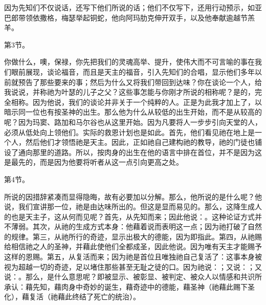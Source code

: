 因为先知们不仅说话，还写下他们所说的话；他们不仅写下，还用行动预示，如亚巴郎带领依撒格，梅瑟举起铜蛇，他向阿玛肋克伸开双手，以及他奉献逾越节羔羊。\par

第3节。\par

你做什么，噢，保禄，你先把我们的灵魂高举、提升，使伟大而不可言喻的事在我们眼前展现，谈论福音，而且是天主的福音，引入先知们的合唱，显示他们多年以前就预告了那些要来的事；然后为什么又将我们带回到达味？你在谈论一个人，给我说说，并称祂为叶瑟的儿子之父？这些事怎能与你刚才所说的相称呢？是的，完全相称。因为他说，我们的谈论并非关于一个纯粹的人。正是为此我才加上了，以暗示同一位也有按圣神的出生。那么他为什么从较低的出生开始，而不是从较高的呢？因为玛窦、路加和马尔谷也从这里开始。因为凡要将人一步步引向天堂的人，必须从低处向上领他们。实际的救恩计划也是如此。首先，他们看见祂在地上是一个人，然后他们才领悟祂是天主。因此，正如祂自己建构祂的教导，祂的门徒也铺设了通向那里的道路。所以，按肉身的出生在他的语言中排在首位，并不是因为这是最先的，而是因为他要将听者从这一点引向更高之处。\par

第4节。\par

所说的因措辞紧凑而显得隐晦，故有必要加以分解。那么，他所说的是什么呢？他说，我们宣讲那一位，祂是由达味所出的。但这是显而易见的。那么，这降生成人的也是天主子，这从何而见呢？首先，从先知而来；因此他说：。这种论证方式并不薄弱。其次，从祂的生成方式本身：他藉着说而表明这一点；因为祂打破了自然的规律。第三，从祂所行的奇迹，显示出极大的德能，因为即指此。第四，从祂赐给相信祂之人的圣神，并藉此使他们全都成圣，因此他说。因为唯有天主才能赐予这样的恩赐。第五，从复活而来；因为祂是首位且唯独祂自己复活了：这事本身被视为超越一切的奇迹，足以堵住那些甚至无耻之徒的口。因为祂说：；又说：；又说：。那么，是什么意思呢？即被显示、被彰显、被判定、被众人以情感和共识所承认：藉先知，藉肉身中奇妙的诞生，藉奇迹中的德能，藉圣神（祂藉此赐下圣化），藉复活（祂藉此终结了死亡的统治）。\par

